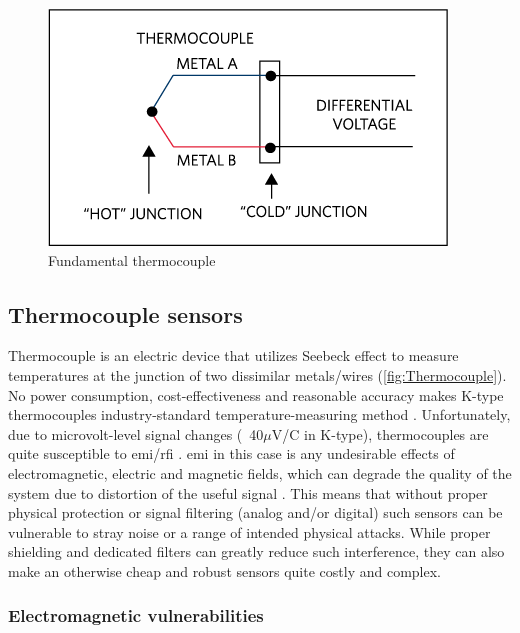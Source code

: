 \begin{figure} [h]
    \centering
    \includegraphics[width=\linewidth]{pictures/TC.png}
    \caption{Fundamental thermocouple \cite{Ismail17}}
    \label{fig:TCouple}
\end{figure}

\subsection{Thermocouple sensors}

Thermocouple is an electric device that utilizes Seebeck effect to measure temperatures at the junction of two dissimilar metals/wires (\cref{fig:Thermocouple}). No power consumption, cost-effectiveness and reasonable accuracy makes K-type thermocouples industry-standard temperature-measuring method \cite{Duff10}. Unfortunately, due to microvolt-level signal changes (~40$\mu$V/\textdegree{}C in K-type), thermocouples are quite susceptible to \ac{emi}/\ac{rfi} \cite{Smalcerz2013,Astm93}. \ac{emi} in this case is any undesirable effects of electromagnetic, electric and magnetic fields, which can degrade the quality of the system due to distortion of the useful signal \cite{Getz96}. This means that without proper physical protection or signal filtering (analog and/or digital) such sensors can be vulnerable to stray noise or a range of intended physical attacks. While proper shielding and dedicated filters can greatly reduce such interference, they can also make an otherwise cheap and robust sensors quite costly and complex. 

\subsubsection{Electromagnetic vulnerabilities}


